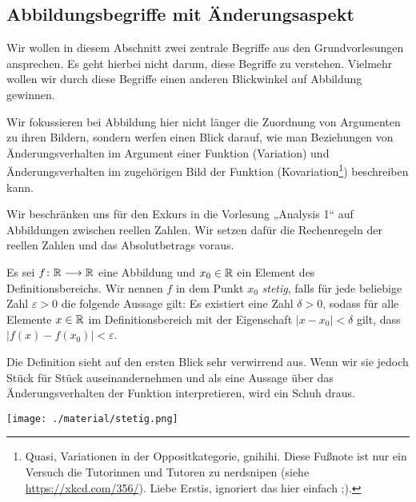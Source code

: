 
\subsection{Abbildungsbegriffe mit Änderungsaspekt}


Wir wollen in diesem Abschnitt zwei zentrale Begriffe aus den Grundvorlesungen
ansprechen. Es geht hierbei nicht darum, diese Begriffe zu verstehen. Vielmehr
wollen wir durch diese Begriffe einen anderen Blickwinkel auf Abbildung
gewinnen.

Wir fokussieren bei Abbildung hier nicht länger die Zuordnung von Argumenten zu
ihren Bildern, sondern werfen einen Blick darauf, wie man Beziehungen von
Änderungsverhalten im Argument einer Funktion (Variation) und Änderungsverhalten
im zugehörigen Bild der Funktion (Kovariation\footnote{Quasi, Variationen in der
  Oppositkategorie, gnihihi. Diese Fußnote ist nur ein Versuch die Tutorinnen
  und Tutoren zu nerdsnipen (siehe \url{https://xkcd.com/356/}). Liebe Erstis,
  ignoriert das hier einfach ;).}) beschreiben kann.


Wir beschränken uns für den Exkurs in die Vorlesung „Analysis 1“ auf Abbildungen
zwischen reellen Zahlen. Wir setzen dafür die Rechenregeln der reellen Zahlen
und das Absolutbetrags voraus.

\begin{defin}
  Es sei $f\colon \mathbb R \longrightarrow \mathbb R$ eine Abbildung und $x_{0}\in\mathbb R$ ein Element des
  Definitionsbereichs. Wir nennen $f$ in dem Punkt $x_{0}$ \emph{stetig}, falls
  für jede beliebige Zahl $\varepsilon > 0$ die folgende Aussage gilt: Es existiert
  eine Zahl $\delta > 0$, sodass für alle Elemente $x\in \mathbb R$ im
  Definitionsbereich mit der Eigenschaft $|x - x_{0}| < \delta$ gilt, dass
  $|f(x) - f(x_{0})| < \varepsilon$.
\end{defin}


Die Definition sieht auf den ersten Blick sehr verwirrend aus. Wenn wir sie
jedoch Stück für Stück auseinandernehmen und als eine Aussage über das
Änderungsverhalten der Funktion interpretieren, wird ein Schuh draus.


\begin{center}
  \texttt{[image: ./material/stetig.png]}
\end{center}

